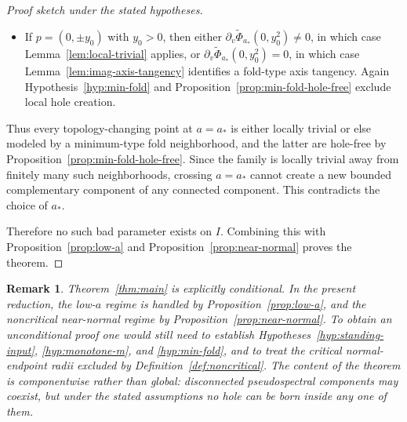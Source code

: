 \documentclass[11pt]{article}
\newtheorem{remark}[theorem]{Remark}
\begin{document}
\begin{proof}[Proof sketch under the stated hypotheses]
\begin{itemize}
\item If \(p=(0,\pm y_0)\) with \(y_0>0\), then either \(\partial_v\widetilde\Phi_{a_*}(0,y_0^2)\neq 0\), in which case Lemma~\ref{lem:local-trivial} applies, or \(\partial_v\widetilde\Phi_{a_*}(0,y_0^2)=0\), in which case Lemma~\ref{lem:imag-axis-tangency} identifies a fold-type axis tangency. Again Hypothesis~\ref{hyp:min-fold} and Proposition~\ref{prop:min-fold-hole-free} exclude local hole creation.
\end{itemize}

Thus every topology-changing point at \(a=a_*\) is either locally trivial or else modeled by a minimum-type fold neighborhood, and the latter are hole-free by Proposition~\ref{prop:min-fold-hole-free}. Since the family is locally trivial away from finitely many such neighborhoods, crossing \(a=a_*\) cannot create a new bounded complementary component of any connected component. This contradicts the choice of \(a_*\).

Therefore no such bad parameter exists on \(I\). Combining this with Proposition~\ref{prop:low-a} and Proposition~\ref{prop:near-normal} proves the theorem.
\end{proof}

\begin{remark}
Theorem~\ref{thm:main} is explicitly conditional. In the present reduction, the low-\(a\) regime is handled by Proposition~\ref{prop:low-a}, and the noncritical near-normal regime by Proposition~\ref{prop:near-normal}. To obtain an unconditional proof one would still need to establish Hypotheses~\ref{hyp:standing-input}, \ref{hyp:monotone-m}, and \ref{hyp:min-fold}, and to treat the critical normal-endpoint radii excluded by Definition~\ref{def:noncritical}. The content of the theorem is componentwise rather than global: disconnected pseudospectral components may coexist, but under the stated assumptions no hole can be born inside any one of them.
\end{remark}
\end{document}
